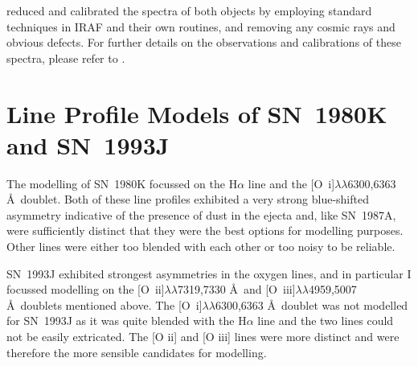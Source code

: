 \citet{Milisavljevic2012} reduced and calibrated the spectra of both objects by employing
standard techniques in IRAF and their own routines, and removing any cosmic rays and obvious defects. For further details on the observations and calibrations of these spectra, please refer to \citet{Milisavljevic2012}. 




\section{Line Profile Models of SN~1980K and SN~1993J}
\label{80K_93J_models}
The modelling of SN~1980K focussed on the H$\alpha$ line and the [O~{\sc i}]$\lambda\lambda$6300,6363 \AA\  doublet.  Both of these line profiles exhibited a very strong blue-shifted asymmetry indicative of the presence of dust in the ejecta and, like SN~1987A, were sufficiently distinct that they were the best options for modelling purposes.  Other lines were either too blended with each other or too noisy to be reliable.  

SN~1993J exhibited strongest asymmetries in the oxygen lines, and in particular I focussed modelling on the [O~{\sc ii}]$\lambda\lambda$7319,7330 \AA\  and [O~{\sc iii}]$\lambda\lambda$4959,5007 \AA\  doublets mentioned above.  The [O~{\sc i}]$\lambda\lambda$6300,6363 \AA\ doublet was not modelled for SN~1993J as it was quite blended with the H$\alpha$ line and the two lines could not be easily extricated.  The [O {\sc ii}] and [O {\sc iii}] lines were more distinct and were therefore the more sensible candidates for modelling.

